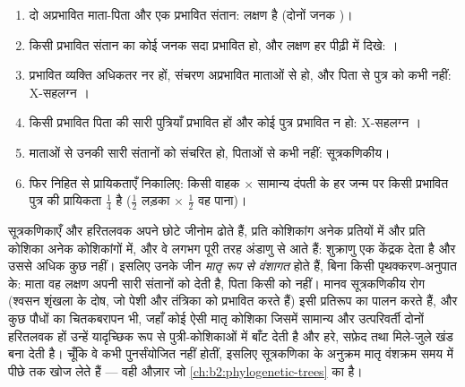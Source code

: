\begin{method}[कोई वंशावली पढ़ना]\label{met:b2:meiosis-heredity:pedigree}
\begin{enumerate}
  \item दो अप्रभावित माता-पिता और एक प्रभावित संतान: लक्षण
         है (दोनों जनक )।
  \item किसी प्रभावित संतान का कोई जनक सदा प्रभावित हो, और लक्षण हर
        पीढ़ी में दिखे: ।
  \item प्रभावित व्यक्ति अधिकतर नर हों, संचरण अप्रभावित माताओं से हो,
        और पिता से पुत्र को कभी नहीं: X-सहलग्न ।
  \item किसी प्रभावित पिता की सारी पुत्रियाँ प्रभावित हों और कोई पुत्र
        प्रभावित न हो: X-सहलग्न ।
  \item माताओं से उनकी सारी संतानों को संचरित हो, पिताओं से कभी नहीं:
        सूत्रकणिकीय।
  \item फिर निहित  से प्रायिकताएँ निकालिए:
        किसी वाहक $\times$ सामान्य दंपती के हर जन्म पर किसी प्रभावित
        पुत्र की प्रायिकता $\tfrac14$ है ($\tfrac12$ लड़का $\times$ $\tfrac12$
        वह  पाना)।
\end{enumerate}
\end{method}

\begin{definition}[केंद्रक-बाह्य वंशागति]\label{def:b2:meiosis-heredity:extranuclear}
सूत्रकणिकाएँ और हरितलवक अपने छोटे जीनोम ढोते हैं, प्रति कोशिकांग अनेक
प्रतियों में और प्रति कोशिका अनेक कोशिकांगों में, और वे लगभग पूरी तरह
अंडाणु से आते हैं: शुक्राणु एक केंद्रक देता है और उससे अधिक कुछ नहीं।
इसलिए उनके जीन \emph{मातृ रूप से वंशागत} होते हैं, बिना किसी
पृथक्करण-अनुपात के: माता वह लक्षण अपनी सारी संतानों को देती है, पिता
किसी को नहीं। मानव सूत्रकणिकीय रोग (श्वसन शृंखला के दोष, जो पेशी और
तंत्रिका को प्रभावित करते हैं) इसी प्रतिरूप का पालन करते हैं, और कुछ
पौधों का चितकबरापन भी, जहाँ कोई ऐसी मातृ कोशिका जिसमें सामान्य और
उत्परिवर्ती दोनों हरितलवक हों उन्हें यादृच्छिक रूप से पुत्री-कोशिकाओं
में बाँट देती है और हरे, सफ़ेद तथा मिले-जुले खंड बना देती है। चूँकि वे
कभी पुनर्संयोजित नहीं होतीं, इसलिए सूत्रकणिका के अनुक्रम मातृ वंशक्रम
समय में पीछे तक खोज लेते हैं --- वही औज़ार जो
\cref{ch:b2:phylogenetic-trees} का है।
\end{definition}

